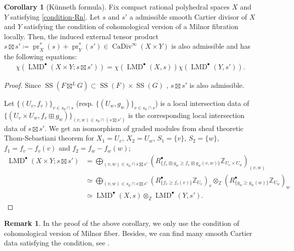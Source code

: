 \documentclass[a4paper,dvipdfmx,reqno,12pt]{amsart}
\theoremstyle{definition}
\newtheorem{corollary}[theorem]{Corollary}
\newtheorem{remark}[theorem]{Remark}
\newcommand{\deq}{\coloneqq}
\newcommand{\Z}{\mathbb{Z}}%
\newcommand{\opn}[1]{\operatorname{#1}}
\numberwithin{equation}{section}
\begin{document}
\begin{corollary}[{K\"unneth formula}]
Fix compact rational polyhedral spaces $X$ and $Y$
satisfying \cref{condition-Rn}.
Let $s$ and $s'$ a admissible smooth Cartier divisor of $X$ and $Y$ 
satisfying the condition of cohomological version of a Milnor 
fibration \cite[Assumption 1.1.1]{MR2031639} locally.
Then, the induced external tensor product 
$s\boxtimes s'\deq \opn{pr}_X^{*} (s)+\opn{pr}_Y^{*}(s')
\in \opn{CaDiv}^{\infty}(X\times Y)$ is also admissible and
has the following equations:
\begin{align}
\chi(\opn{LMD}^{\bullet}(X\times Y;s\boxtimes s'))=
\chi(\opn{LMD}^{\bullet}(X,s))\chi(\opn{LMD}^{\bullet}(Y,s')).
\end{align}

\end{corollary}
\begin{proof}
Since 
$\opn{SS}(F\boxtimes^{L} G)\subset \opn{SS}(F)\times \opn{SS}(G)$
\cite[Proposition 5.4.1]{MR1299726},
$s\boxtimes s'$ is also admissible.

Let $\{(U_v,f_v)\}_{v\in s_0\cap s}$
(resp. $\{(U_w,g_w)\}_{v\in s_0\cap s}$) is a
local intersection data of
$\{(U_{v}\times U_w,f_v\boxplus g_w)\}_{
(v,w)\in s_0 \cap 
(s\boxtimes s')}$ is the 
corresponding local intersection data 
of $s\boxtimes s'$.  
We get an isomorphism of graded modules
from sheaf theoretic Thom-Sebastiani theorem for 
$X_1=U_{v}$, $X_2=U_w$, $S_1=\{v\}$, $S_2=\{w\}$,
$f_1= f_v-f_v(v)$ and 
$f_2= f_w-f_w(w)$;
\begin{align}
\opn{LMD}^{\bullet}(X\times Y;s\boxtimes s') 
& =\bigoplus_{(v,w)\in s_0\cap s\boxtimes s'}
(R^{\bullet}_{\{f_v\boxplus g_w\geq f_v\boxplus g_w(v,w)\}}
\Z_{U_{v}\times U_w})_{(v,w)} \\
& \simeq \bigoplus_{(v,w)\in s_0\cap s\boxtimes s'}
(R^{\bullet}_{\{f_v\geq f_v(v)\}}\Z_{U_v})_v
\otimes_{\Z} (R^{\bullet}_{\{g_w\geq g_w(w)\}}\Z_{U_w})_w \\
& \simeq
\opn{LMD}^{\bullet}(X,s)\otimes_{\Z} 
\opn{LMD}^{\bullet}(Y,s').
\end{align}

\end{proof}

\begin{remark}
In the proof of the above corollary, we only use
the condition of cohomological version of Milnor fiber. 
Besides, we can find many smooth Cartier data satisfying 
the condition, see \cite[p.35]{MR2031639}.  
\end{remark}
\end{document}
